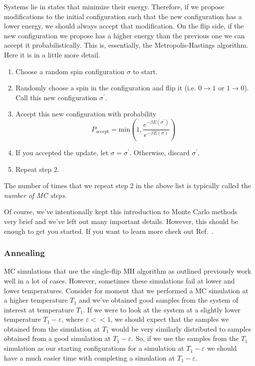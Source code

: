 \documentclass[12pt]{article}
\begin{document}
Systems lie in states that minimize their energy. Therefore, if we propose modifications to the initial configuration such that the new configuration has a lower energy, we should always accept that modification. On the flip side, if the new configuration we propose has a higher energy than the previous one we can accept it probabilistically. This is, essentially, the Metropolis-Hastings algorithm. Here it is in a little more detail. 
\begin{enumerate}
    \item Choose a random spin configuration $\sigma$ to start. 
    \item Randomly choose a spin in the configuration and flip it (i.e. $0 \rightarrow 1$ or $1 \rightarrow 0$). Call this new configuration $\sigma^{\prime}$.
    \item Accept this new configuration with probability
        \begin{equation} \label{eq:acceptance}
            P_{\text{accept}} = \text{min}\left(1, \frac{e^{-\beta E(\sigma^\prime)}}{e^{-\beta E(\sigma)}}\right)
        \end{equation}
    \item If you accepted the update, let $\sigma = \sigma^\prime$. Otherwise, discard $\sigma^\prime$. 
    \item Repeat step 2.
\end{enumerate}
The number of times that we repeat step 2 in the above list is typically called the {\it number of MC steps}.

Of course, we've intentionally kept this introduction to Monte Carlo methods very brief and we've left out many important details. However, this should be enough to get you started. If you want to learn more check out Ref.~\cite{NewmanMC}.

\subsubsection{Annealing}

MC simulations that use the single-flip MH algorithm as outlined previously work well in a lot of cases. However, sometimes these simulations fail at lower and lower temperatures. Consider for moment that we performed a MC simulation at a higher temperature $T_1$ and we've obtained good samples from the system of interest at temperature $T_1$. If we were to look at the system at a slightly lower temperature $T_1 - \varepsilon$, where $\varepsilon << 1$, we should expect that the samples we obtained from the simulation at $T_1$ would be very similarly distributed to samples obtained from a good simulation at $T_1 - \varepsilon$. So, if we use the samples from the $T_1$ simulation as our starting configurations for a simulation at $T_1 - \varepsilon$ we should have a much easier time with completing a simulation at $T_1 - \varepsilon$.
\end{document}

